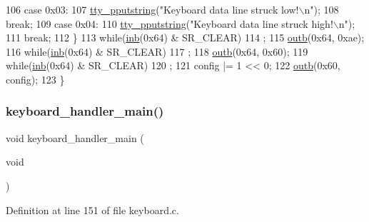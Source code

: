 \begin{DoxyCode}
106         \textcolor{keywordflow}{case} 0x03:
107             \hyperlink{a00173_ade960b1320324706aac6c00cc6b1b2fe_ade960b1320324706aac6c00cc6b1b2fe}{tty\_pputstring}(\textcolor{stringliteral}{"Keyboard data line struck low!\(\backslash\)n"});
108             \textcolor{keywordflow}{break};
109         \textcolor{keywordflow}{case} 0x04:
110             \hyperlink{a00173_ade960b1320324706aac6c00cc6b1b2fe_ade960b1320324706aac6c00cc6b1b2fe}{tty\_pputstring}(\textcolor{stringliteral}{"Keyboard data line struck high!\(\backslash\)n"});
111             \textcolor{keywordflow}{break};
112     \}
113     \textcolor{keywordflow}{while}(\hyperlink{a00164_a0223c8898dfec29069879dc51076e28a_a0223c8898dfec29069879dc51076e28a}{inb}(0x64) & SR\_CLEAR)
114         ;
115     \hyperlink{a00164_aa37f5841c54156a4b14fc0d6f626b44f_aa37f5841c54156a4b14fc0d6f626b44f}{outb}(0x64, 0xae);
116     \textcolor{keywordflow}{while}(\hyperlink{a00164_a0223c8898dfec29069879dc51076e28a_a0223c8898dfec29069879dc51076e28a}{inb}(0x64) & SR\_CLEAR)
117         ;
118     \hyperlink{a00164_aa37f5841c54156a4b14fc0d6f626b44f_aa37f5841c54156a4b14fc0d6f626b44f}{outb}(0x64, 0x60);
119     \textcolor{keywordflow}{while}(\hyperlink{a00164_a0223c8898dfec29069879dc51076e28a_a0223c8898dfec29069879dc51076e28a}{inb}(0x64) & SR\_CLEAR)
120         ;
121     config |= 1 << 0;
122     \hyperlink{a00164_aa37f5841c54156a4b14fc0d6f626b44f_aa37f5841c54156a4b14fc0d6f626b44f}{outb}(0x60, config);
123 \}
\end{DoxyCode}
\mbox{\label{a00038_a1db933be72a0547c4070ba55e6697ba2_a1db933be72a0547c4070ba55e6697ba2}} 
\subsubsection{\texorpdfstring{keyboard\+\_\+handler\+\_\+main()}{keyboard\_handler\_main()}}
{\footnotesize\ttfamily void keyboard\+\_\+handler\+\_\+main (\begin{DoxyParamCaption}\item[{void}]{ }\end{DoxyParamCaption})}



Definition at line 151 of file keyboard.\+c.


